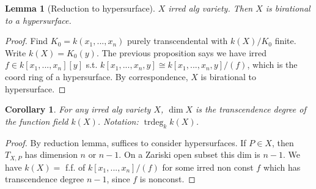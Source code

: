 \documentclass{article}
\theoremstyle{definition}
\theoremstyle{remark}
\theoremstyle{plain}
\newtheorem{lem}[defn]{Lemma}
\newtheorem{crly}[defn]{Corollary}
\begin{document}
\begin{lem}[Reduction to hypersurface]
    $X$ irred alg variety. Then $X$ is birational to a hypersurface.
\end{lem}
\begin{proof}
    Find $K_0=k(x_1,...,x_n)$ purely transcendental with $k(X)/K_0$ finite. Write $k(X)=K_0(y)$. The previous proposition says we have irred $f\in k[x_1,...,x_n][y]$ s.t. $k[x_1,...,x_n,y]\cong k[x_1,...,x_n,y]/(f)$, which is the coord ring of a hypersurface. By correspondence, $X$ is birational to hypersurface.
\end{proof}
\begin{crly}
    For any irred alg variety $X$, $\dim X$ is the transcendence degree of the function field $k(X)$. Notation: $\operatorname{trdeg}_kk(X)$.
\end{crly}
\begin{proof}
    By reduction lemma, suffices to consider hypersurfaces. If $P\in X$, then $T_{X,P}$ has dimension $n$ or $n-1$. On a Zariski open subset this dim is $n-1$. We have $k(X)=$ f.f. of $k[x_1,...,x_n]/(f)$ for some irred non const $f$ which has transcendence degree $n-1$, since $f$ is nonconst.
\end{proof}
\end{document}
